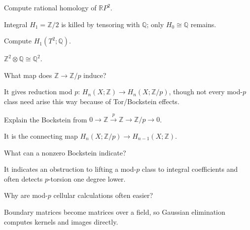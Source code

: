 \begin{problem}\label{prob:viii25-07}
Compute rational homology of \(\mathbb RP^2\).
\end{problem}
\begin{solution}
Integral \(H_1=\mathbb Z/2\) is killed by tensoring with \(\mathbb Q\); only \(H_0\cong\mathbb Q\) remains.
\end{solution}

\begin{problem}\label{prob:viii25-08}
Compute \(H_1(T^2;\mathbb Q)\).
\end{problem}
\begin{solution}
\(\mathbb Z^2\otimes\mathbb Q\cong\mathbb Q^2\).
\end{solution}

\begin{problem}\label{prob:viii25-09}
What map does \(\mathbb Z\to\mathbb Z/p\) induce?
\end{problem}
\begin{solution}
It gives reduction mod \(p\): \(H_n(X;\mathbb Z)\to H_n(X;\mathbb Z/p)\), though not every mod-\(p\) class need arise this way because of Tor/Bockstein effects.
\end{solution}

\begin{problem}\label{prob:viii25-10}
Explain the Bockstein from \(0\to\mathbb Z\xrightarrow p\mathbb Z\to\mathbb Z/p\to0\).
\end{problem}
\begin{solution}
It is the connecting map \(H_n(X;\mathbb Z/p)\to H_{n-1}(X;\mathbb Z)\).
\end{solution}

\begin{problem}\label{prob:viii25-11}
What can a nonzero Bockstein indicate?
\end{problem}
\begin{solution}
It indicates an obstruction to lifting a mod-\(p\) class to integral coefficients and often detects \(p\)-torsion one degree lower.
\end{solution}

\begin{problem}\label{prob:viii25-12}
Why are mod-\(p\) cellular calculations often easier?
\end{problem}
\begin{solution}
Boundary matrices become matrices over a field, so Gaussian elimination computes kernels and images directly.
\end{solution}

